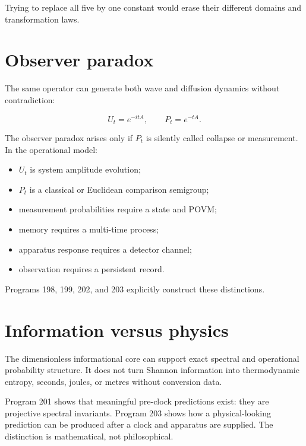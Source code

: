 \documentclass[11pt,a4paper,openany]{report}
\begin{document}
Trying to replace all five by one constant would erase their different domains and transformation laws.

\section{Observer paradox}

The same operator can generate both wave and diffusion dynamics without contradiction:

\[
U_t=e^{-itA},
\qquad
P_t=e^{-tA}.
\]

The observer paradox arises only if \(P_t\) is silently called collapse or measurement. In the operational model:

\begin{itemize}
\item 
\(U_t\) is system amplitude evolution;

\item 
\(P_t\) is a classical or Euclidean comparison semigroup;

\item 
measurement probabilities require a state and POVM;

\item 
memory requires a multi-time process;

\item 
apparatus response requires a detector channel;

\item 
observation requires a persistent record.

\end{itemize}

Programs 198, 199, 202, and 203 explicitly construct these distinctions.

\section{Information versus physics}

The dimensionless informational core can support exact spectral and operational probability structure. It does not turn Shannon information into thermodynamic entropy, seconds, joules, or metres without conversion data.

Program 201 shows that meaningful pre-clock predictions exist: they are projective spectral invariants. Program 203 shows how a physical-looking prediction can be produced after a clock and apparatus are supplied. The distinction is mathematical, not philosophical.
\end{document}

